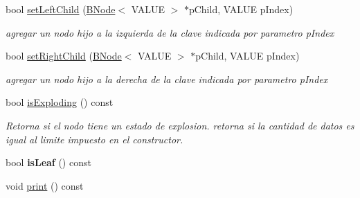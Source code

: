 \begin{DoxyCompactItemize}
bool \hyperlink{classBNode_ace75c9ba9b3479cafda7fc4d62801601}{set\-Left\-Child} (\hyperlink{classBNode}{B\-Node}$<$ V\-A\-L\-U\-E $>$ $\ast$p\-Child, V\-A\-L\-U\-E p\-Index)
\begin{DoxyCompactList}\small\item\em agregar un nodo hijo a la izquierda de la clave indicada por parametro p\-Index \end{DoxyCompactList}\item 
bool \hyperlink{classBNode_a9533a736b61bb9bf42f0e87b1e3275a3}{set\-Right\-Child} (\hyperlink{classBNode}{B\-Node}$<$ V\-A\-L\-U\-E $>$ $\ast$p\-Child, V\-A\-L\-U\-E p\-Index)
\begin{DoxyCompactList}\small\item\em agregar un nodo hijo a la derecha de la clave indicada por parametro p\-Index \end{DoxyCompactList}\item 
bool \hyperlink{classBNode_ac10d387a2400fcc956719b2c1816b54c}{is\-Exploding} () const 
\begin{DoxyCompactList}\small\item\em Retorna si el nodo tiene un estado de explosion. retorna si la cantidad de datos es igual al limite impuesto en el constructor. \end{DoxyCompactList}\item 
\hypertarget{classBNode_a64a90eaeefe69e066fd2abceb3a8a86e}{bool {\bfseries is\-Leaf} () const }\label{classBNode_a64a90eaeefe69e066fd2abceb3a8a86e}

\item 
\hypertarget{classBNode_a4cfbe2867e900577efc3836fd207b008}{void \hyperlink{classBNode_a4cfbe2867e900577efc3836fd207b008}{print} () const }\label{classBNode_a4cfbe2867e900577efc3836fd207b008}


\end{DoxyCompactItemize}
